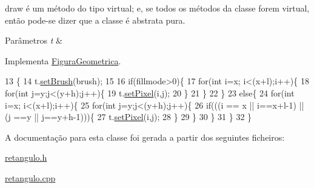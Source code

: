 draw é um método do tipo virtual; e, se todos os métodos da classe forem virtual, então pode-\/se dizer que a classe é abstrata pura. 


\begin{DoxyParams}{Parâmetros}
{\em t} & \\
\hline
\end{DoxyParams}


Implementa \hyperlink{class_figura_geometrica_a06404670d06d28d12f5f386901186925}{Figura\+Geometrica}.


\begin{DoxyCode}
13                              \{
14     t.\hyperlink{class_screen_aebc4eb6cb5acf15a0f04c1494622ab23}{setBrush}(brush);
15 
16     \textcolor{keywordflow}{if}(fillmode>0)\{
17         \textcolor{keywordflow}{for}(\textcolor{keywordtype}{int} i=x; i<(x+l);i++)\{
18             \textcolor{keywordflow}{for}(\textcolor{keywordtype}{int} j=y;j<(y+h);j++)\{
19                 t.\hyperlink{class_screen_ae6bea81c57a22d226507c3c26fa95ee0}{setPixel}(i,j);
20             \}
21         \}
22     \}
23     \textcolor{keywordflow}{else}\{
24         \textcolor{keywordflow}{for}(\textcolor{keywordtype}{int} i=x; i<(x+l);i++)\{
25             \textcolor{keywordflow}{for}(\textcolor{keywordtype}{int} j=y;j<(y+h);j++)\{
26                 \textcolor{keywordflow}{if}(((i == x || i==x+l-1) || (j ==y || j==y+h-1)))\{
27                 t.\hyperlink{class_screen_ae6bea81c57a22d226507c3c26fa95ee0}{setPixel}(i,j);
28                 \}
29             \}
30         \}
31     \}
32 \}
\end{DoxyCode}


A documentação para esta classe foi gerada a partir dos seguintes ficheiros\+:\begin{DoxyCompactItemize}
\item 
\hyperlink{retangulo_8h}{retangulo.\+h}\item 
\hyperlink{retangulo_8cpp}{retangulo.\+cpp}\end{DoxyCompactItemize}
